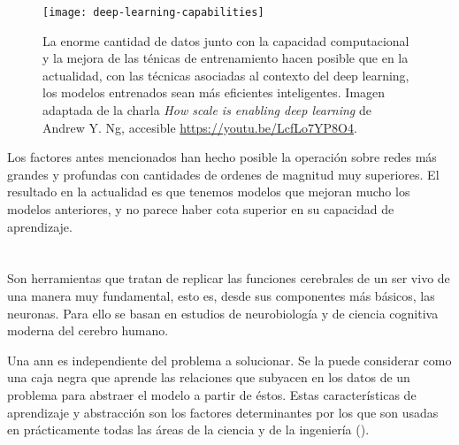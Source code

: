 \begin{figure}
	\texttt{[image: deep-learning-capabilities]}
	\caption[Capacidad de los modelos en función de la cantidad de datos]{La enorme cantidad de datos junto con la capacidad computacional y la mejora de las ténicas de entrenamiento hacen posible que en la actualidad, con las técnicas asociadas al contexto del deep learning, los modelos entrenados sean más eficientes  inteligentes. Imagen adaptada de la charla \textit{How scale is enabling deep learning} de Andrew Y. Ng, accesible \url{https://youtu.be/LcfLo7YP8O4}.}
	\label{fig:deep-learning-capabilities}
\end{figure}

Los factores antes mencionados han hecho posible la operación sobre redes más grandes y profundas con cantidades de ordenes de magnitud muy superiores. El resultado en la actualidad es que tenemos modelos que mejoran mucho los modelos anteriores, y no parece haber cota superior en su capacidad de aprendizaje.


\section{}

Son herramientas que tratan de replicar las funciones cerebrales de un ser vivo de una manera muy fundamental, esto es, desde sus componentes más básicos, las neuronas. Para ello se basan en estudios de neurobiología y de ciencia cognitiva moderna del cerebro humano.

Una \gls{ann} es independiente del problema a solucionar. Se la puede considerar como una caja negra que aprende las relaciones que subyacen en los datos de un problema para abstraer el modelo a partir de éstos. Estas características de aprendizaje y abstracción son los factores determinantes por los que son usadas en prácticamente todas las áreas de la ciencia y de la ingeniería (\cite{Du2006}).

